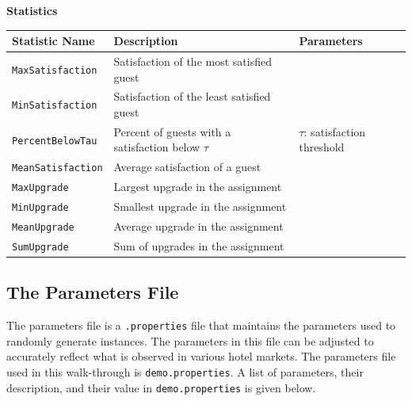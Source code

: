 \documentclass[11 pt]{article}
\begin{document}
\vspace{1cm}
\begin{center}
\textbf{Statistics}
\end{center}
\begin{center}
\begin{tabular}{|l|l|l|}
\hline
\textbf{Statistic Name} & \textbf{Description} & \textbf{Parameters} \\
\hline
\texttt{MaxSatisfaction} & Satisfaction of the most satisfied guest & \\
\hline
\texttt{MinSatisfaction} & Satisfaction of the least satisfied guest & \\
\hline
\texttt{PercentBelowTau} & Percent of guests with a satisfaction below $\tau$ & $\tau$: satisfaction threshold \\
\hline
\texttt{MeanSatisfaction} & Average satisfaction of a guest & \\
\hline
\texttt{MaxUpgrade} & Largest upgrade in the assignment  & \\
\hline
\texttt{MinUpgrade} & Smallest upgrade in the assignment  & \\
\hline
\texttt{MeanUpgrade} & Average upgrade in the assignment  & \\
\hline
\texttt{SumUpgrade} & Sum of upgrades in the assignment  & \\
\hline
\end{tabular}
\end{center}

\newpage

\subsection{The Parameters File}

\par The parameters file is a \texttt{.properties} file that maintains the parameters used to randomly generate instances. The parameters in this file can be adjusted to accurately reflect what is observed in various hotel markets. The parameters file used in this walk-through is \texttt{demo.properties}. A list of parameters, their description, and their value in \texttt{demo.properties} is given below.
\end{document}
